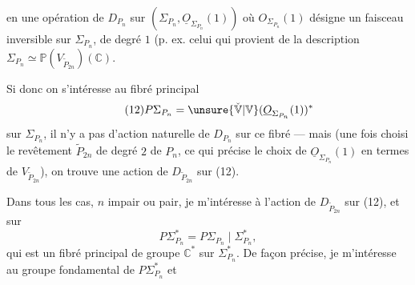 en une opération de $D_{P_n}$ sur $(\Sigma_{P_n},\underline O_{\Sigma_{P_n}}(1))$ où $O_{\Sigma_{P_n}}(1)$ désigne un faisceau inversible sur $\Sigma_{P_n}$, de degré $1$ (p. ex. celui qui provient de la description  $\Sigma_{P_n}\simeq\mathbb P(V_{\widetilde P_{2n}})(\mathbb C)$.

Si donc on s'intéresse au fibré principal
\[
\tag{12}P\Sigma_{P_n}=\unsure{\check{\mathbb V}|\mathbb V}(\underline O_{\Sigma_{P_n}}(1))^*
\]
sur $\Sigma_{P_n}$, il n'y a pas d'action naturelle de $D_{P_n}$ sur ce fibré — mais (une fois choisi le revêtement $\widetilde P_{2n}$ de degré $2$ de $P_n$,  ce qui précise le choix de $\underline O_{\Sigma_{P_n}}(1)$ en termes de $V_{\widetilde P_{2n}}$), on trouve une action de $D_{\widetilde P_{2n}}$ sur (12).

Dans tous les cas, $n$ impair ou pair, je m'intéresse à l'action de $D_{\widetilde P_{2n}}$ sur (12), et sur 
\[
\tag{13}P\Sigma_{P_n}^*=P\Sigma_{P_n}\mid\Sigma_{P_n}^*,
\]
qui est un fibré principal de groupe $\mathbb C^*$ sur $\Sigma_{P_n}^*$. De façon précise, je m'intéresse au groupe fondamental de $P\Sigma_{P_n}^*$ et 

